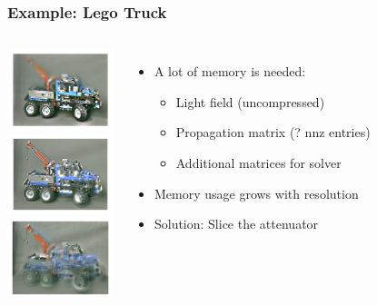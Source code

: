 \documentclass[12pt, compress]{beamer}
\begin{document}
\begin{frame}[fragile]
	\frametitle{Example: Lego Truck}
	
	\begin{columns}
			\includegraphics[width = 3.1cm]{images/layers_and_projections/legotruck/3}
			\\
			\includegraphics[width = 3.1cm]{images/layers_and_projections/legotruck/2}
			\\
			\includegraphics[width = 3.1cm]{images/layers_and_projections/legotruck/1}
			\\
			\begin{itemize}
				\item A lot of memory is needed:
					\begin{itemize}
						\item Light field (uncompressed)
						\item Propagation matrix (? nnz entries)
						\item Additional matrices for solver
					\end{itemize}
				\item Memory usage grows with resolution
				\item Solution: Slice the attenuator
			\end{itemize}
	\end{columns}
	
\end{frame}
\end{document}
